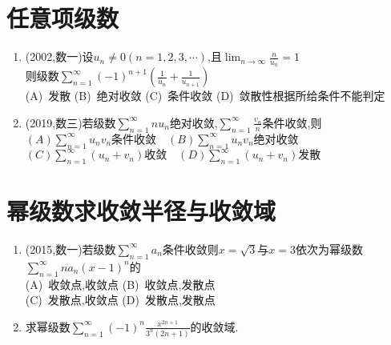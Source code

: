 \documentclass[12pt, a4paper, oneside, UTF8]{ctexbook}
\begin{document}
\section{任意项级数}

\begin{enumerate}[label=\arabic*.,start=4]
    \item (2002,数一)设$u_n\neq 0(n=1,2,3,\cdots)$,且$\displaystyle\lim_{n\rightarrow\infty}\frac{n}{u_n}=1$ \\
    则级数$\displaystyle\sum_{n=1}^{\infty}(-1)^{n+1}\left(\frac{1}{u_n}+\frac{1}{u_{n+1}}\right)$ \\
    (A)\ 发散 \quad (B)\ 绝对收敛 \quad (C)\ 条件收敛 \quad (D)\ 敛散性根据所给条件不能判定
    
    \begin{solution}
    \newpage
    \end{solution}
    
    \item (2019,数三)若级数$\displaystyle\sum_{n=1}^{\infty}nu_n$绝对收敛,$\displaystyle\sum_{n=1}^{\infty}\frac{v_n}{n}$条件收敛,则 \\
    $\displaystyle(A)\sum_{n=1}^{\infty} u_n v_n\text{条件收敛} \quad (B)\sum_{n=1}^{\infty} u_n v_n\text{绝对收敛}$ \\
    $\displaystyle(C)\sum_{n=1}^{\infty}\left(u_n+v_n\right)\text{收敛} \quad (D)\sum_{n=1}^{\infty}\left(u_n+v_n\right)\text{发散}$
    
    
    \begin{solution}
    \newpage
    \end{solution}
\end{enumerate}

\section{幂级数求收敛半径与收敛域}

\begin{enumerate}[label=\arabic*.,start=6]
    \item (2015,数一)若级数$\displaystyle\sum_{n=1}^{\infty} a_n$条件收敛则$x=\sqrt{3}$与$x=3$依次为幂级数 \\
    $\displaystyle\sum_{n=1}^{\infty} n a_n(x-1)^n$的 \\
    (A)\ 收敛点,收敛点 \qquad (B)\ 收敛点,发散点\\ 
    (C)\ 发散点,收敛点 \qquad (D)\ 发散点,发散点
    
    \begin{solution}
    \newpage
    \end{solution}
    
    \item 求幂级数$\displaystyle\sum_{n=1}^{\infty}(-1)^n\frac{x^{2n+1}}{3^n(2n+1)}$的收敛域.
    
    \begin{solution}
    \newpage
    \end{solution}
\end{enumerate}
\end{document}
